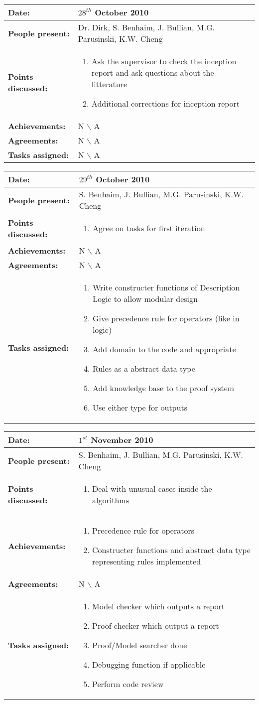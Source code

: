 \documentclass[12pt,a4paper]{article}
\newcommand{\meeting}[6]{%
\begin{center}%
\begin{longtable}{| p{3.5cm}  | p{13cm} |}%
\hline%
\textbf{Date:} & #1 \\%
\hline%
\textbf{People present:} &#2 \\%
\hline%
\textbf{Points discussed:} &#3\\%
\hline%
\textbf{Achievements:} &#4 \\%
\hline%
\textbf{Agreements:} &#5 \\%
\hline%
\textbf{Tasks assigned:} &#6  \\%
\hline%
\end{longtable}%
\end{center}%
\bigbreak
}
\begin{document}
\meeting{$28^{th}$ October 2010}%
{Dr. Dirk, S. Benhaim, J. Bullian, M.G. Parusinski, K.W. Cheng}%
{ \begin{enumerate} 
\item Ask the supervisor to check the inception report and ask questions about the litterature
\item Additional corrections for inception report
\end{enumerate} }%
{ N $\backslash$ A}%
{N $\backslash$ A}
{N $\backslash$ A}%

\meeting{$29^{th}$ October 2010}%
{S. Benhaim, J. Bullian, M.G. Parusinski, K.W. Cheng}%
{ \begin{enumerate} 
\item Agree on tasks for first iteration
\end{enumerate} }%
{ N $\backslash$ A}%
{N $\backslash$ A}
{\begin{enumerate}
\item Write constructer functions of Description Logic to allow modular design
\item Give precedence rule for operators (like in logic)
\item Add domain to the code and appropriate
\item Rules as a abstract data type
\item Add knowledge base to the proof system
\item Use either type for outputs
\end{enumerate}}%

\meeting{$1^{st}$ November 2010}%
{S. Benhaim, J. Bullian, M.G. Parusinski, K.W. Cheng}%
{\begin{enumerate} 
\item  Deal with unusual cases inside the algorithms
\end{enumerate} }%
{\begin{enumerate}
\item Precedence rule for operators
\item Constructer functions and abstract data type representing rules implemented
\end{enumerate}}%
{N $\backslash$ A}
{\begin{enumerate}
\item Model checker which outputs a report
\item Proof checker which output a report
\item Proof/Model searcher done
\item Debugging function if applicable
\item Perform code review
\end{enumerate}}%
\end{document}
